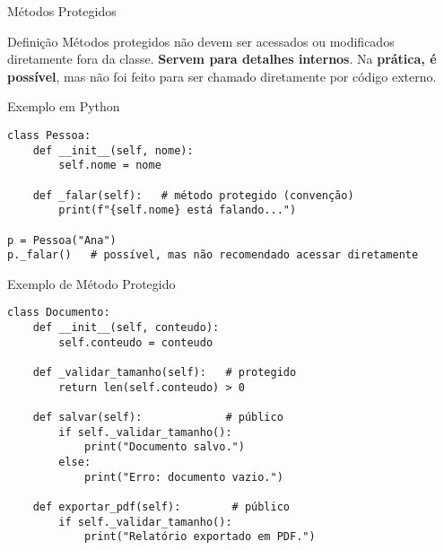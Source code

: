 \begin{frame}[fragile]{Métodos Protegidos}

    \begin{block}{Definição}
        Métodos protegidos não devem ser acessados ou modificados diretamente fora da classe. \textbf{Servem para detalhes internos}. Na \textbf{prática, é possível}, mas não foi feito para ser chamado diretamente por código externo.
    \end{block}

    \begin{exampleblock}{Exemplo em Python}
        \begin{verbatim}
class Pessoa:
    def __init__(self, nome):
        self.nome = nome

    def _falar(self):   # método protegido (convenção)
        print(f"{self.nome} está falando...")

p = Pessoa("Ana")
p._falar()   # possível, mas não recomendado acessar diretamente
\end{verbatim}
    \end{exampleblock}

\end{frame}


\begin{frame}[fragile]{Exemplo de Método Protegido}

    \begin{verbatim}
class Documento:
    def __init__(self, conteudo):
        self.conteudo = conteudo
        
    def _validar_tamanho(self):   # protegido
        return len(self.conteudo) > 0
        
    def salvar(self):             # público
        if self._validar_tamanho():
            print("Documento salvo.")
        else:
            print("Erro: documento vazio.")

    def exportar_pdf(self):        # público
        if self._validar_tamanho():  
            print("Relatório exportado em PDF.")
\end{verbatim}

\end{frame}


